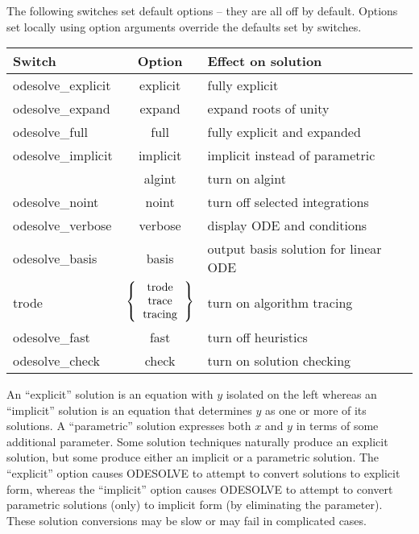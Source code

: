 The following switches set default options -- they are all off by
default.  Options set locally using option arguments override the
defaults set by switches.
\begin{center}
\begin{tabular}{lcl}
\bf Switch         & \bf Option  & \bf Effect on solution \\
\hline
odesolve\_explicit & explicit    & fully explicit \\
odesolve\_expand   & expand      & expand roots of unity \\
odesolve\_full     & full        & fully explicit and expanded \\
odesolve\_implicit & implicit    & implicit instead of parametric \\
                   & algint      & turn on algint \\
odesolve\_noint    & noint       & turn off selected integrations \\
odesolve\_verbose  & verbose     & display ODE and conditions \\
odesolve\_basis    & basis       & output basis solution for linear ODE \\
trode              & $\left\{\begin{tabular}{c}trode\\trace\\tracing\end{tabular}\right\}$
                                 & turn on algorithm tracing \\
odesolve\_fast     & fast        & turn off heuristics \\
odesolve\_check    & check       & turn on solution checking
\end{tabular}
\end{center}

An ``explicit'' solution is an equation with $y$ isolated on the left
whereas an ``implicit'' solution is an equation that determines $y$ as
one or more of its solutions.  A ``parametric'' solution expresses
both $x$ and $y$ in terms of some additional parameter.  Some solution
techniques naturally produce an explicit solution, but some produce
either an implicit or a parametric solution.  The ``explicit'' option
causes ODESOLVE to attempt to convert solutions to explicit form,
whereas the ``implicit'' option causes ODESOLVE to attempt to convert
parametric solutions (only) to implicit form (by eliminating the
parameter).  These solution conversions may be slow or may fail in
complicated cases.

